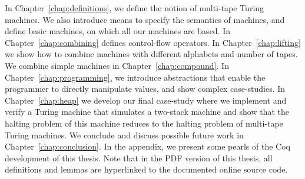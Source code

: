 In Chapter~\ref{chap:definitions}, we define the notion of multi-tape Turing machines.  We also introduce means to specify the semantics of machines,
and define basic machines, on which all our machines are based.  In Chapter~\ref{chap:combining} defines control-flow operators.  In
Chapter~\ref{chap:lifting} we show how to combine machines with different alphabets and number of tapes.  We combine simple machines in
Chapter~\ref{chap:compound}.  In Chapter~\ref{chap:programming}, we introduce abstractions that enable the programmer to directly manipulate values,
and show complex case-studies.  In Chapter~\ref{chap:heap} we develop our final case-study where we implement and verify a Turing machine that
simulates a two-stack machine and show that the halting problem of this machine reduces to the halting problem of multi-tape Turing machines.  We
conclude and discuss possible future work in Chapter~\ref{chap:conclusion}.  In the appendix, we present some pearls of the Coq development of this
thesis.  Note that in the PDF version of this thesis, all definitions and lemmas are hyperlinked to the documented online source code.


